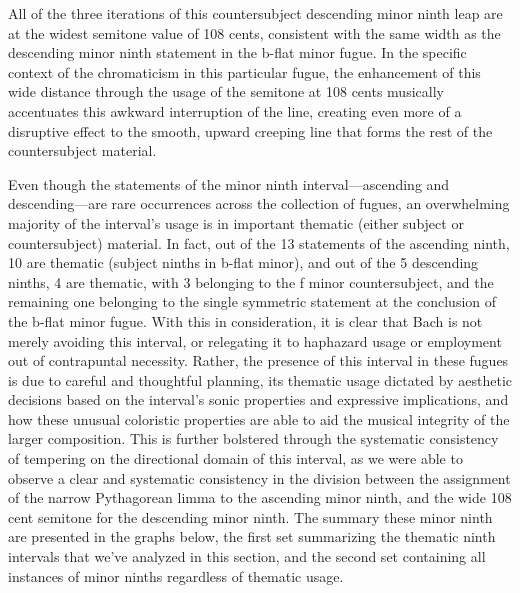     \begin{center}
    \end{center}
    
    All of the three iterations of this countersubject descending minor
ninth leap are at the widest semitone value of 108 cents, consistent
with the same width as the descending minor ninth statement in the
b-flat minor fugue. In the specific context of the chromaticism in this
particular fugue, the enhancement of this wide distance through the
usage of the semitone at 108 cents musically accentuates this awkward
interruption of the line, creating even more of a disruptive effect to
the smooth, upward creeping line that forms the rest of the
countersubject material.

Even though the statements of the minor ninth interval---ascending
and descending---are rare occurrences across the collection of
fugues, an overwhelming majority of the interval's usage is in important
thematic (either subject or countersubject) material. In fact, out of
the 13 statements of the ascending ninth, 10 are thematic (subject
ninths in b-flat minor), and out of the 5 descending ninths, 4 are
thematic, with 3 belonging to the f minor countersubject, and the
remaining one belonging to the single symmetric statement at the
conclusion of the b-flat minor fugue. With this in consideration, it is
clear that Bach is not merely avoiding this interval, or relegating it
to haphazard usage or employment out of contrapuntal necessity. Rather,
the presence of this interval in these fugues is due to careful and
thoughtful planning, its thematic usage dictated by aesthetic decisions
based on the interval's sonic properties and expressive implications,
and how these unusual coloristic properties are able to aid the musical
integrity of the larger composition. This is further bolstered through
the systematic consistency of tempering on the directional domain of
this interval, as we were able to observe a clear and systematic
consistency in the division between the assignment of the narrow
Pythagorean limma to the ascending minor ninth, and the wide 108 cent
semitone for the descending minor ninth. The summary these minor ninth
are presented in the graphs below, the first set summarizing the
thematic ninth intervals that we've analyzed in this section, and the
second set containing all instances of minor ninths regardless of
thematic usage.


    \begin{center}
    \end{center}
    

